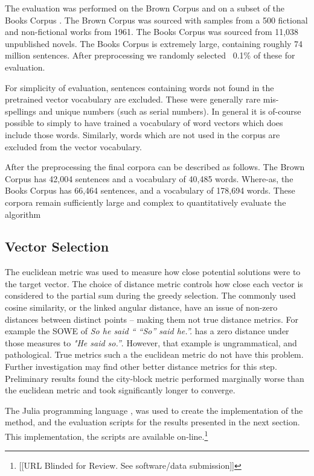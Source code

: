 \documentclass{llncs}
\begin{document}
The evaluation was performed on the Brown Corpus \parencite{francis1979brown} and on a subset of the Books Corpus \parencite{moviebook}. The Brown Corpus was sourced with samples from a 500 fictional and non-fictional works from 1961. The Books Corpus was sourced from 11,038 unpublished novels. The Books Corpus is extremely large, containing roughly 74 million sentences. After preprocessing we randomly selected ~0.1\% of these for evaluation.

For simplicity of evaluation, sentences containing words not found in the pretrained vector vocabulary are excluded. These were generally rare mis-spellings and unique numbers (such as serial numbers). In general it is of-course possible to simply to have trained a vocabulary of word vectors which does include those words. Similarly, words which are not used in the corpus are excluded from the vector vocabulary. 

After the preprocessing the final corpora can be described as follows. The Brown Corpus has 42,004 sentences and a vocabulary of 40,485 words. Where-as, the Books Corpus has 66,464 sentences, and a vocabulary of 178,694 words. These corpora remain sufficiently large and complex to quantitatively evaluate the algorithm

\subsection{Vector Selection}
The euclidean metric was used to measure how close potential solutions were to the target vector. The choice of distance metric controls how close each vector is considered to the partial sum during the greedy selection. The commonly used cosine similarity, or the linked angular distance, have an issue of non-zero distances between distinct points -- making them not true distance metrics. For example the SOWE of \emph{So he said `` ``So'' said he.''.} has a zero distance under those measures to \emph{"He said so.''}. However, that example is ungrammatical, and pathological. True metrics such a the euclidean metric do not have this problem. Further investigation may find other better distance metrics for this step. Preliminary results found the city-block metric performed marginally worse than the euclidean metric and took significantly longer to converge.

The Julia programming language \parencite{Julia}, was used to create the implementation of the method, and the evaluation scripts for the results presented in the next section. This implementation, the scripts are available on-line.\footnote{[[URL Blinded for Review. See software/data submission]]}
\end{document}

